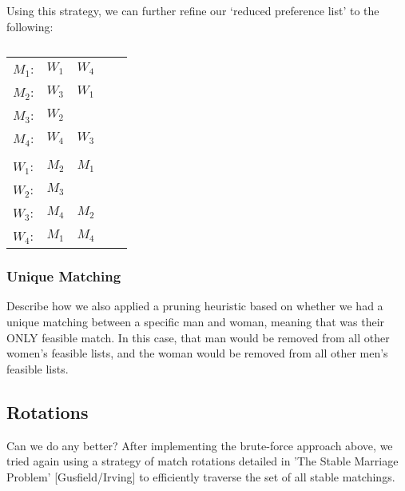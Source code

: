 \documentclass[a4paper]{article}
\begin{document}
Using this strategy, we can further refine our `reduced preference list' to the following:
\begin{table}[H]
\centering
\caption{}
\begin{tabular}{lllll}
$M_1$: & $W_1$ & $W_4$ & &       \\
$M_2$: & $W_3$ & $W_1$ \\
$M_3$: & $W_2$ & & &          \\
$M_4$: & $W_4$ & $W_3$ & &       \\
                        \\
$W_1$: & $M_2$ & $M_1$ &    \\
$W_2$: & $M_3$ & & &          \\
$W_3$: & $M_4$ & $M_2$ & &       \\
$W_4$: & $M_1$ & $M_4$ & &       \\
\end{tabular}
\end{table}

\subsubsection{Unique Matching}
Describe how we also applied a pruning heuristic based on whether we had a unique matching between a specific man and woman, meaning that was their ONLY feasible match.  In this case, that man would be removed from all other women's feasible lists, and the woman would be removed from all other men's feasible lists.

\subsection{Rotations}
Can we do any better? After implementing the brute-force approach above, we tried again using a strategy of match rotations detailed in 'The Stable Marriage Problem' [Gusfield/Irving] to efficiently traverse the set of all stable matchings.
\end{document}

